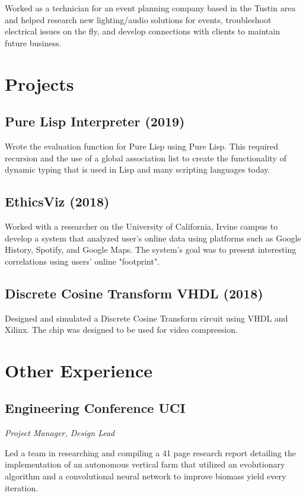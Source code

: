 \documentclass{article}
\begin{document}
Worked as a technician for an event planning company based in the Tustin area and helped research
new lighting/audio solutions for events, troubleshoot electrical issues on the fly, and develop 
connections with clients to maintain future business.

\section{Projects}

\subsection{Pure Lisp Interpreter (2019)}

Wrote the evaluation function for Pure Lisp using Pure Lisp. This required recursion and the use of a global 
association list to create the functionality of dynamic typing that is used in Lisp and many scripting languages today.

\subsection{EthicsViz (2018)}

Worked with a researcher on the University of California, Irvine campus to develop a system that analyzed 
user's online data using platforms such as Google History, Spotify, and Google Maps. The system's goal was to 
present interesting correlations using users' online "footprint".

\subsection{Discrete Cosine Transform VHDL (2018)}

Designed and simulated a Discrete Cosine Transform circuit using VHDL and Xilinx. The chip was designed to be 
used for video compression. 

\section{Other Experience}

\subsection{Engineering Conference UCI}

\textit{Project Manager, Design Lead}

Led a team in researching and compiling a 41 page research report detailing the implementation of an autonomous vertical farm that utilized an evolutionary algorithm and a convolutional neural network to improve biomass yield every iteration.
\end{document}
